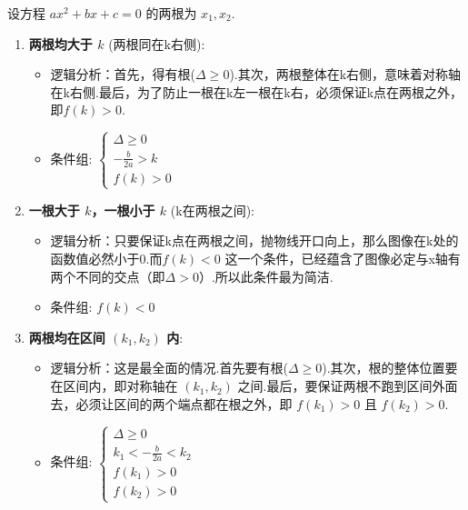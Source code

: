 	\begin{property}[常见根分布的等价条件 ($a>0$)]
		设方程 $ax^2+bx+c=0$ 的两根为 $x_1, x_2$.
		\begin{enumerate}
			\item \textbf{两根均大于 $k$} (两根同在k右侧):
			\begin{itemize}
				\item 逻辑分析：首先，得有根($\Delta \ge 0$).其次，两根整体在k右侧，意味着对称轴在k右侧.最后，为了防止一根在k左一根在k右，必须保证k点在两根之外，即$f(k)>0$.
				\item 条件组: $\begin{cases} \Delta \ge 0 \\ -\frac{b}{2a} > k \\ f(k) > 0 \end{cases}$
			\end{itemize}
			
			\item \textbf{一根大于 $k$，一根小于 $k$} (k在两根之间):
			\begin{itemize}
				\item 逻辑分析：只要保证k点在两根之间，抛物线开口向上，那么图像在k处的函数值必然小于0.而$f(k)<0$ 这一个条件，已经蕴含了图像必定与x轴有两个不同的交点（即$\Delta>0$）.所以此条件最为简洁.
				\item 条件组: $f(k) < 0$
			\end{itemize}
			
			\item \textbf{两根均在区间 $(k_1, k_2)$ 内}:
			\begin{itemize}
				\item 逻辑分析：这是最全面的情况.首先要有根($\Delta \ge 0$).其次，根的整体位置要在区间内，即对称轴在 $(k_1,k_2)$ 之间.最后，要保证两根不跑到区间外面去，必须让区间的两个端点都在根之外，即 $f(k_1)>0$ 且 $f(k_2)>0$.
				\item 条件组: $\begin{cases} \Delta \ge 0 \\ k_1 < -\frac{b}{2a} < k_2 \\ f(k_1) > 0 \\ f(k_2) > 0 \end{cases}$
			\end{itemize}
		\end{enumerate}
	\end{property}
	
